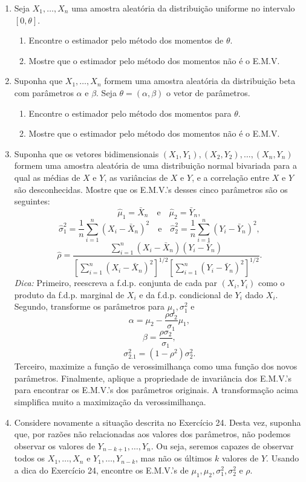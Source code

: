 \begin{enumerate}
    \item Seja $X_1, \dots, X_n$ uma amostra aleatória da distribuição uniforme no intervalo $[0, \theta]$.
    \begin{enumerate}
        \item Encontre o estimador pelo método dos momentos de $\theta$.
        \item Mostre que o estimador pelo método dos momentos não é o E.M.V.
    \end{enumerate}
    
    \item Suponha que $X_1, \dots, X_n$ formem uma amostra aleatória da distribuição beta com parâmetros $\alpha$ e $\beta$. Seja $\theta=(\alpha, \beta)$ o vetor de parâmetros.
    \begin{enumerate}
        \item Encontre o estimador pelo método dos momentos para $\theta$.
        \item Mostre que o estimador pelo método dos momentos não é o E.M.V.
    \end{enumerate}
    
    \item Suponha que os vetores bidimensionais $(X_1, Y_1), (X_2, Y_2), \dots, (X_n, Y_n)$ formem uma amostra aleatória de uma distribuição normal bivariada para a qual as médias de $X$ e $Y$, as variâncias de $X$ e $Y$, e a correlação entre $X$ e $Y$ são desconhecidas. Mostre que os E.M.V.'s desses cinco parâmetros são os seguintes:
    $$ \hat{\mu}_1 = \bar{X}_n \quad \text{e} \quad \hat{\mu}_2 = \bar{Y}_n, $$
    $$ \hat{\sigma}_1^2 = \frac{1}{n}\sum_{i=1}^{n}(X_i - \bar{X}_n)^2 \quad \text{e} \quad \hat{\sigma}_2^2 = \frac{1}{n}\sum_{i=1}^{n}(Y_i - \bar{Y}_n)^2, $$
    $$ \hat{\rho} = \frac{\sum_{i=1}^{n}(X_i - \bar{X}_n)(Y_i - \bar{Y}_n)}{\left[\sum_{i=1}^{n}(X_i - \bar{X}_n)^2\right]^{1/2}\left[\sum_{i=1}^{n}(Y_i - \bar{Y}_n)^2\right]^{1/2}}. $$
    \textit{Dica:} Primeiro, reescreva a f.d.p. conjunta de cada par $(X_i, Y_i)$ como o produto da f.d.p. marginal de $X_i$ e da f.d.p. condicional de $Y_i$ dado $X_i$. Segundo, transforme os parâmetros para $\mu_1, \sigma_1^2$ e
    $$ \alpha = \mu_2 - \frac{\rho\sigma_2}{\sigma_1}\mu_1, $$
    $$ \beta = \frac{\rho\sigma_2}{\sigma_1}, $$
    $$ \sigma_{2.1}^2 = (1-\rho^2)\sigma_2^2. $$
    Terceiro, maximize a função de verossimilhança como uma função dos novos parâmetros. Finalmente, aplique a propriedade de invariância dos E.M.V.'s para encontrar os E.M.V.'s dos parâmetros originais. A transformação acima simplifica muito a maximização da verossimilhança.
    
    \item Considere novamente a situação descrita no Exercício 24. Desta vez, suponha que, por razões não relacionadas aos valores dos parâmetros, não podemos observar os valores de $Y_{n-k+1}, \dots, Y_n$. Ou seja, seremos capazes de observar todos os $X_1, \dots, X_n$ e $Y_1, \dots, Y_{n-k}$, mas não os últimos $k$ valores de $Y$. Usando a dica do Exercício 24, encontre os E.M.V.'s de $\mu_1, \mu_2, \sigma_1^2, \sigma_2^2$ e $\rho$.
\end{enumerate}